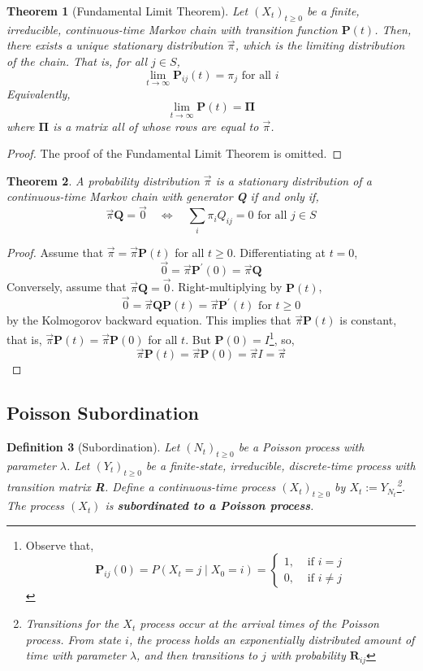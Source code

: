 \documentclass{tufte-handout}
\newtheorem{thm}{Theorem}
\newtheorem{defn}[thm]{Definition}
\begin{document}
\begin{thm}[Fundamental Limit Theorem]
  Let $\left(X_{t}\right)_{t \geq 0}$ be a finite, irreducible, continuous-time Markov chain with transition function $\boldsymbol{P}(t)$. Then, there exists a unique stationary distribution $\Vec{\pi}$, which is the limiting distribution of the chain. That is, for all $j \in S$,
  \[\lim _{t \rightarrow \infty} \mathbf{P}_{i j}(t)=\pi_j \text { for all } i\]
  \noindent Equivalently,
  \[\lim _{t \rightarrow \infty} \boldsymbol{P}(t)=\boldsymbol{\Pi}\]
  \noindent where $\boldsymbol{\Pi}$ is a matrix all of whose rows are equal to $\Vec{\pi}$.
\end{thm}

\begin{proof}
  The proof of the Fundamental Limit Theorem is omitted.
\end{proof}

\begin{thm}
  A probability distribution $\Vec{\pi}$ is a stationary distribution of a continuous-time Markov chain with generator \textbf{Q} if and only if,
  \[\Vec{\pi}\mathbf{Q} = \Vec{0} \quad \iff \quad \sum_{i} \pi_{i} Q_{i j}=0 \text { for all } j \in S\]
\end{thm}

\begin{proof}
  Assume that $\Vec{\pi} = \Vec{\pi} \mathbf{P}(t)$ for all $t \geq 0$. Differentiating at $t = 0$,
  \[\Vec{0} = \Vec{\pi}\mathbf{P}^{\prime}(0) = \Vec{\pi}\mathbf{Q}\]
  \noindent Conversely, assume that $\Vec{\pi}\mathbf{Q} = \Vec{0}$. Right-multiplying by $\mathbf{P}(t)$,
  \[\Vec{0} = \Vec{\pi}\mathbf{Q}\mathbf{P}(t) = \Vec{\pi}\mathbf{P}^{\prime}(t) \text{ for $t \geq 0$}\]
  \noindent by the Kolmogorov backward equation. This implies that $\Vec{\pi}\mathbf{P}(t)$ is constant, that is, $\Vec{\pi}\mathbf{P}(t) = \Vec{\pi}\mathbf{P}(0)$ for all $t$. But $\mathbf{P}(0) = I$\footnote{Observe that,
  \[\mathbf{P}_{i j}(0) = P(X_t = j \mid X_0 = i) = \begin{cases}1, & \text { if } i=j \\ 0, & \text { if } i \neq j\end{cases}\]
  }, so,
  \[\Vec{\pi} \mathbf{P}(t) = \Vec{\pi} \mathbf{P}(0) = \Vec{\pi} I = \Vec{\pi}\]
\end{proof}

\subsection{Poisson Subordination}
 \begin{defn}[Subordination]
   Let $(N_t)_{t \geq 0}$ be a Poisson process with parameter $\lambda$. Let $(Y_t)_{t \geq 0}$ be a finite-state, irreducible, discrete-time process with transition matrix \textbf{R}. Define a continuous-time process $(X_t)_{t \geq 0}$ by $X_t := Y_{N_t}$\footnote{Transitions for the $X_t$ process occur at the arrival times of the Poisson process. From state $i$, the process holds an exponentially distributed amount of time with parameter $\lambda$, and then transitions to $j$ with probability $\mathbf{R}_{ij}$}. The process $(X_t)$ is \textbf{subordinated to a Poisson process}.
 \end{defn}
\end{document}

